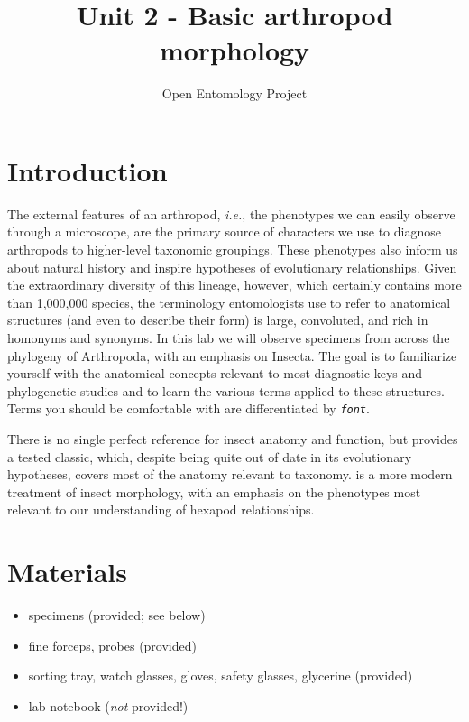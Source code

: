 \documentclass[letterpaper, 11pt]{article}
\title{Unit 2 - Basic arthropod morphology}
\author{Open Entomology Project}
\newcommand{\latinword}[1]{\texttt{\itshape #1}}%
\begin{document}
\cleanlookdateon %
\maketitle
\thispagestyle{fancy}
\section*{Introduction}
The external features of an arthropod, \textit{i.e.}, the phenotypes we can easily observe through a microscope, are the primary source of characters we use to diagnose arthropods to higher-level taxonomic groupings. These phenotypes also inform us about natural history and inspire hypotheses of evolutionary relationships. Given the extraordinary diversity of this lineage, however, which certainly contains more than 1,000,000 species, the terminology entomologists use to refer to anatomical structures (and even to describe their form) is large, convoluted, and rich in homonyms and synonyms. In this lab we will observe specimens from across the phylogeny of Arthropoda, with an emphasis on Insecta. The goal is to familiarize yourself with the anatomical concepts relevant to most diagnostic keys and phylogenetic studies and to learn the various terms applied to these structures. Terms you should be comfortable with are differentiated by \latinword{font}.

There is no single perfect reference for insect anatomy and function, but \cite{snodgrass1935principles} provides a tested classic, which, despite being quite out of date in its evolutionary hypotheses, covers most of the anatomy relevant to taxonomy. \cite{beutel2013insect} is a more modern treatment of insect morphology, with an emphasis on the phenotypes most relevant to our understanding of hexapod relationships.

\section*{Materials}
\begin{itemize}
	\item {specimens (provided; see below)}
	\item {fine forceps, probes (provided)}
	\item {sorting tray, watch glasses, gloves, safety glasses, glycerine (provided)}
	\item {lab notebook (\textit{not} provided!)}
\end{itemize}
\end{document}
